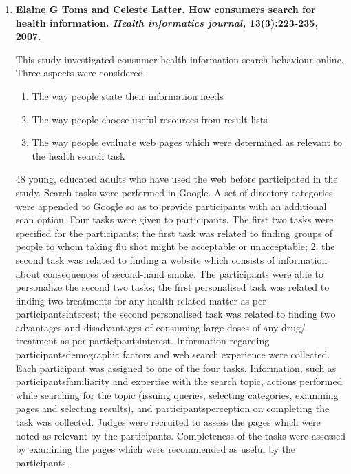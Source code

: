 \documentclass[]{article}
\begin{document}
\begin{enumerate}
\item {\textbf{Elaine G Toms and Celeste Latter. How consumers search for health information. \textit{Health informatics journal,} 13(3):223-235, 2007.}}

This study investigated consumer health information search behaviour online. Three aspects were considered. 

\begin{enumerate}
	\item The way people state their information needs
	\item The way people choose useful resources from result lists
	\item The way people evaluate web pages which were determined as relevant to the health search task  
\end{enumerate}

48 young, educated adults who have used the web before participated in the study. Search tasks were performed in Google. A set of directory categories were appended to Google so as to provide participants with an additional scan option. Four tasks were given to participants. The first two tasks were specified for the participants; the first task was related to finding groups of people to whom taking flu shot might be acceptable or unacceptable; 2. the second task was related to finding a website which consists of information about consequences of second-hand smoke. The participants were able to personalize the second two tasks; the first personalised task was related to finding two treatments for any health-related matter as per participants\textquotesingle interest; the second personalised task was related to finding two advantages and disadvantages of consuming large doses of any drug/ treatment as per participants\textquotesingle interest. Information regarding participants\textquotesingle  demographic factors and web search experience were collected. Each participant was assigned to one of the four tasks. Information, such as participants\textquotesingle familiarity and expertise with the search topic, actions performed while searching for the topic (issuing queries, selecting categories, examining pages and selecting results), and participants\textquotesingle  perception on completing the task was collected. Judges were recruited to assess the pages which were noted as relevant by the participants. Completeness of the tasks were assessed by examining the pages which were recommended as useful by the participants.


\end{enumerate}
\end{document}
